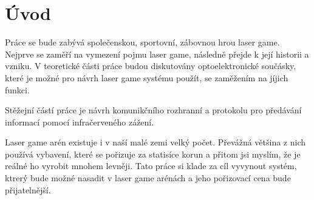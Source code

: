 \chapter*{Úvod}
{}


Práce se bude zabývá společenskou, sportovní, zábovnou hrou laser game. Nejprve se zaměří na vymezení pojmu laser game, následně přejde k její historii a vzniku. V teoretické části práce budou diskutovány optoelektronické součásky, které je možné pro návrh laser game systému použít, se zaměžením na jíjich funkci.

Stěžejní částí práce je návrh komunikčního rozhranní a protokolu pro předávání informací pomocí infračerveného zážení.

Laser game arén existuje i v naší malé zemi velký počet. Převážná většina z nich používá vybavení, které se pořizuje za statisíce korun a přitom jsi myslím, že je reálné ho vyrobit mnohem levněji. Tato práce si klade za cíl vyvynout systém, ktrerý bude možné nasadit v laser game arénách a jeho pořizovací cena bude přijatelnější.
